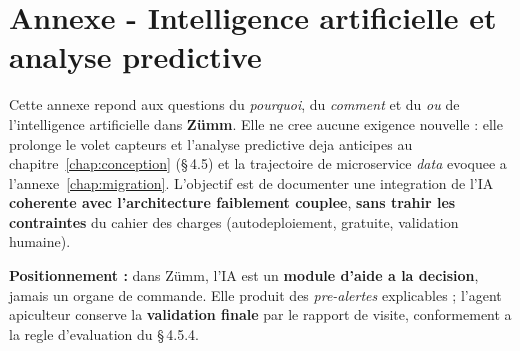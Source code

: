 
\chapter{Annexe - Intelligence artificielle et analyse predictive}
\label{chap:ia}
Cette annexe repond aux questions du \emph{pourquoi}, du \emph{comment} et du
\emph{ou} de l'intelligence artificielle dans \textbf{Z\"umm}. Elle ne cree
aucune exigence nouvelle : elle prolonge le volet capteurs et l'analyse
predictive deja anticipes au chapitre~\ref{chap:conception} (§\,4.5) et la
trajectoire de microservice \emph{data} evoquee a l'annexe~\ref{chap:migration}.
L'objectif est de documenter une integration de l'IA \textbf{coherente avec
l'architecture faiblement couplee}, \textbf{sans trahir les contraintes} du
cahier des charges (autodeploiement, gratuite, validation humaine).

\begin{encadre}
\textbf{Positionnement :} dans Z\"umm, l'IA est un \textbf{module d'aide a la
decision}, jamais un organe de commande. Elle produit des \emph{pre-alertes}
explicables ; l'agent apiculteur conserve la \textbf{validation finale} par le
rapport de visite, conformement a la regle d'evaluation du §\,4.5.4.
\end{encadre}

